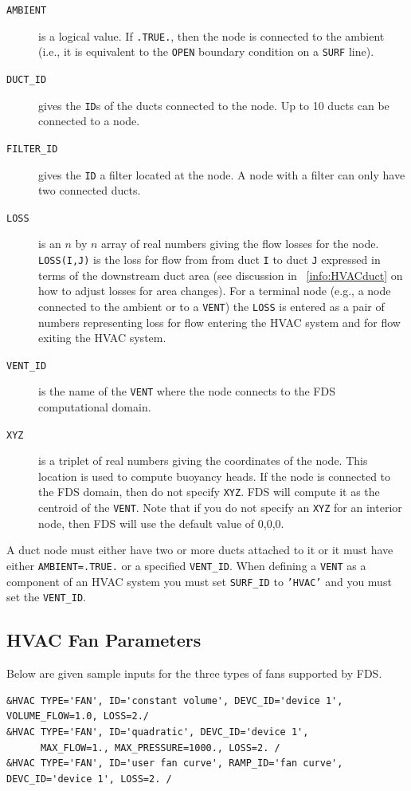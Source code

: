 \documentclass[11pt]{book}
\newcommand{\ct}{\tt\small}
\begin{document}
\begin{description}
\item[{\ct AMBIENT}] is a logical value.  If {\ct .TRUE.}, then the node is connected to the ambient (i.e., it is equivalent to the {\ct OPEN} boundary condition on a {\ct SURF} line).
\item[{\ct DUCT\_ID}] gives the {\ct ID}s of the ducts connected to the node.  Up to 10 ducts can be connected to a node.
\item[{\ct FILTER\_ID}] gives the {\ct ID} a filter located at the node.  A node with a filter can only have two connected ducts.
\item[{\ct LOSS}] is an $n$ by $n$ array of real numbers giving the flow losses for the node.  {\ct LOSS(I,J)} is the loss for flow from from duct {\ct I} to duct {\ct J} expressed in terms of the downstream duct area (see discussion in ~\ref{info:HVACduct} on how to adjust losses for area changes).  For a terminal node (e.g., a node connected to the ambient or to a {\ct VENT}) the {\ct LOSS} is entered as a pair of numbers representing loss for flow entering the HVAC system and for flow exiting the HVAC system.
\item[{\ct VENT\_ID}] is the name of the {\ct VENT} where the node connects to the FDS computational domain.
\item[{\ct XYZ}] is a triplet of real numbers giving the coordinates of the node.  This location is used to compute buoyancy heads.
If the node is connected to the FDS domain, then do not specify {\ct XYZ}.  FDS will compute it as the centroid of the {\ct VENT}. Note that if you do not specify an {\ct XYZ} for an interior node, then FDS will use the default value of 0,0,0.
\end{description}

\noindent
A duct node must either have two or more ducts attached to it or it must have either {\ct AMBIENT=.TRUE.} or a specified {\ct VENT\_ID}.  When defining a {\ct VENT} as a component of an HVAC system you must set {\ct SURF\_ID} to {\ct 'HVAC'} and you must set the {\ct VENT\_ID}.

\subsection{HVAC Fan Parameters}
\label{info:HVACfan}

Below are given sample inputs for the three types of fans supported by FDS.

\footnotesize
\begin{verbatim}
&HVAC TYPE='FAN', ID='constant volume', DEVC_ID='device 1', VOLUME_FLOW=1.0, LOSS=2./
&HVAC TYPE='FAN', ID='quadratic', DEVC_ID='device 1',
      MAX_FLOW=1., MAX_PRESSURE=1000., LOSS=2. /
&HVAC TYPE='FAN', ID='user fan curve', RAMP_ID='fan curve',  DEVC_ID='device 1', LOSS=2. /
\end{verbatim}\normalsize
\end{document}
